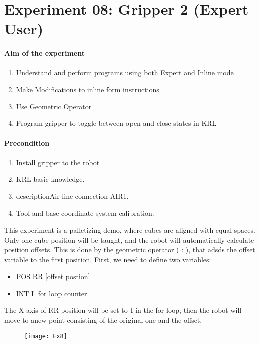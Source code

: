 \section{Experiment 08: Gripper 2 (Expert User)}

\paragraph{Aim of the experiment}
\begin{enumerate}
	\item Understand and perform programs using both Expert and Inline mode
	\item Make Modifications to inline form instructions 
	\item Use Geometric Operator 
	\item Program gripper to toggle between open and close states in KRL
\end{enumerate}

\paragraph{Precondition}
\begin{enumerate}
	\item Install gripper to the robot
	\item KRL basic knowledge.
	\item descriptionAir line connection AIR1. 
	\item Tool and base coordinate system calibration.
\end{enumerate}

This experiment is a palletizing demo, where cubes are aligned with equal spaces. Only one cube position will be taught, and the robot will automatically calculate position offsets. This is done by the geometric operator ( : ), that adsds the offset variable to the first position.
First, we need to define two variables: 
\begin{itemize}
	\item POS RR		[offset postion]
	\item INT I   		[for loop counter]
	
\end{itemize}
The X axis of RR position will be set to I in the for loop, then the robot will move to anew point consisting of the original one and the offset.
\begin{figure}[H]
	\centering
	\texttt{[image: Ex8]}
\end{figure}
%

